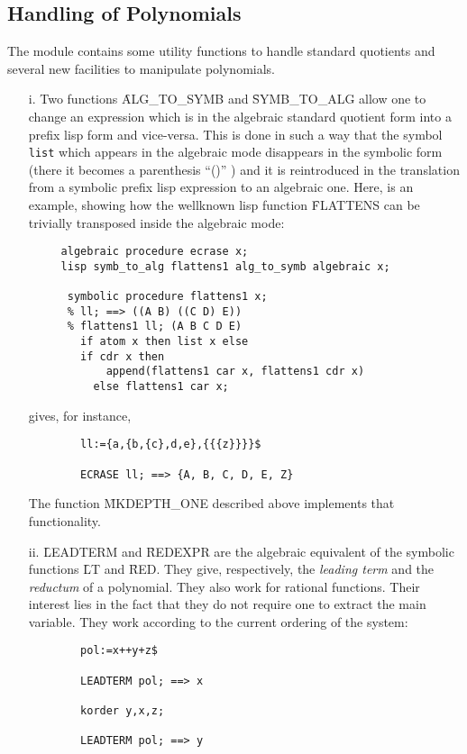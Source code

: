 \subsection{Handling of Polynomials}
The module contains some utility functions to handle
standard quotients and several new facilities to manipulate polynomials.
\begin{itemize}
\item[i.] Two functions \f{ALG\_TO\_SYMB} and \f{SYMB\_TO\_ALG}
allow one to change an expression which is in the algebraic standard
quotient form into a prefix lisp form and vice-versa. This is done
in such a way that the symbol \verb+list+ which appears in the
algebraic mode disappears in the symbolic form (there it becomes
a parenthesis ``()'' ) and it is reintroduced in the translation
from a symbolic prefix lisp expression  to an algebraic one.
Here, is an example, showing how the wellknown lisp function
\f{FLATTENS} can be trivially transposed inside the algebraic mode:
\begin{verbatim}
     algebraic procedure ecrase x;
     lisp symb_to_alg flattens1 alg_to_symb algebraic x;

      symbolic procedure flattens1 x;
      % ll; ==> ((A B) ((C D) E))
      % flattens1 ll; (A B C D E)
        if atom x then list x else
        if cdr x then
            append(flattens1 car x, flattens1 cdr x)
          else flattens1 car x;
\end{verbatim}
gives, for instance,
\begin{verbatim}
        ll:={a,{b,{c},d,e},{{{z}}}}$

        ECRASE ll; ==> {A, B, C, D, E, Z}
\end{verbatim}
The function \f{MKDEPTH\_ONE} described above implements that functionality.
\item[ii.]
\f{LEADTERM} and \f{REDEXPR} are the algebraic equivalent of the
symbolic functions \f{LT} and \f{RED}. They give, respectively, the
{\em leading term} and the {\em reductum} of a polynomial. They also work
for rational functions. Their interest lies in the fact that they do not
require one to extract the main variable. They work according to the current
ordering of the system:
\begin{verbatim}
        pol:=x++y+z$

        LEADTERM pol; ==> x

        korder y,x,z;

        LEADTERM pol; ==> y


\end{verbatim}
\end{itemize}
